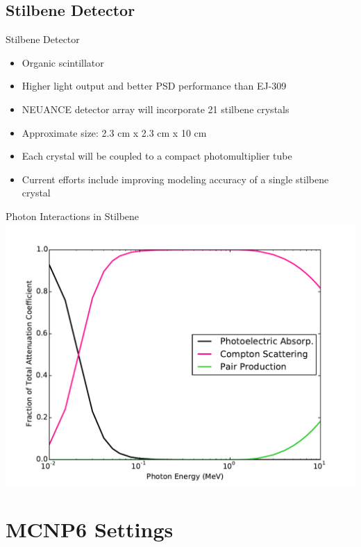 \documentclass{beamer}
\begin{document}
\subsection{Stilbene Detector}
\begin{frame}{Stilbene Detector}
\begin{itemize}
\item Organic scintillator
\item Higher light output and better PSD performance than EJ-309
\item NEUANCE detector array will incorporate 21 stilbene crystals
\item Approximate size: 2.3 cm x 2.3 cm x 10 cm
\item Each crystal will be coupled to a compact photomultiplier tube
\item Current efforts include improving modeling accuracy of a single stilbene crystal
\end{itemize}
\end{frame}

\begin{frame}{Photon Interactions in Stilbene}
\centering
\vskip -0.25cm
\includegraphics[scale=0.45]{interactionCoeff}
\end{frame}


\section{MCNP6 Settings}
\begin{frame}
\sectionpage
\end{frame}
\end{document}
